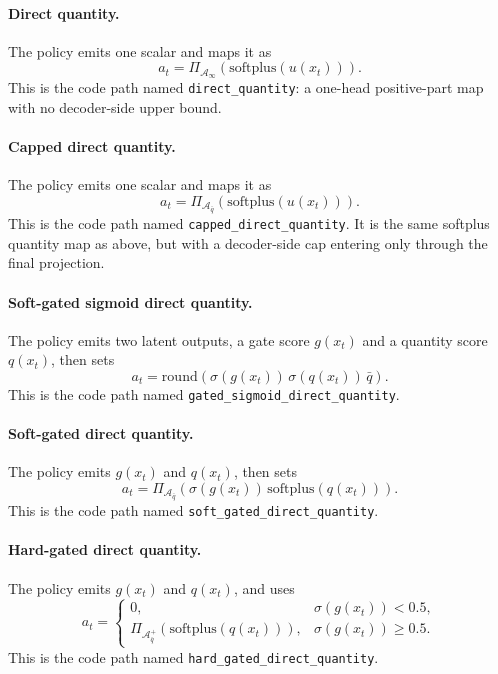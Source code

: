 \documentclass[11pt]{article}
\begin{document}
\paragraph{Direct quantity.}
The policy emits one scalar and maps it as
\[
a_t = \Pi_{\mathcal{A}_{\infty}}\!\left(\mathrm{softplus}(u(x_t))\right).
\]
This is the code path named \texttt{direct\_quantity}: a one-head positive-part map with no
decoder-side upper bound.

\paragraph{Capped direct quantity.}
The policy emits one scalar and maps it as
\[
a_t = \Pi_{\mathcal{A}_{\bar q}}\!\left(\mathrm{softplus}(u(x_t))\right).
\]
This is the code path named \texttt{capped\_direct\_quantity}. It is the same softplus quantity
map as above, but with a decoder-side cap entering only through the final projection.

\paragraph{Soft-gated sigmoid direct quantity.}
The policy emits two latent outputs, a gate score $g(x_t)$ and a quantity score $q(x_t)$, then
sets
\[
a_t = \mathrm{round}\!\left(\sigma(g(x_t)) \, \sigma(q(x_t)) \, \bar q\right).
\]
This is the code path named \texttt{gated\_sigmoid\_direct\_quantity}.

\paragraph{Soft-gated direct quantity.}
The policy emits $g(x_t)$ and $q(x_t)$, then sets
\[
a_t = \Pi_{\mathcal{A}_{\bar q}}\!\left(\sigma(g(x_t)) \, \mathrm{softplus}(q(x_t))\right).
\]
This is the code path named \texttt{soft\_gated\_direct\_quantity}.

\paragraph{Hard-gated direct quantity.}
The policy emits $g(x_t)$ and $q(x_t)$, and uses
\[
a_t =
\begin{cases}
0, & \sigma(g(x_t)) < 0.5, \\
\Pi_{\mathcal{A}_{\bar q}^{+}}\!\left(\mathrm{softplus}(q(x_t))\right),
& \sigma(g(x_t)) \ge 0.5.
\end{cases}
\]
This is the code path named \texttt{hard\_gated\_direct\_quantity}.
\end{document}
